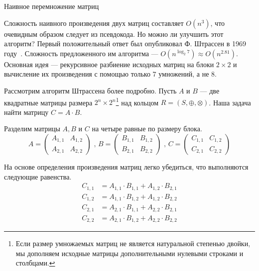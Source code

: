 \begin{algorithm}
\begin{algorithmic}[1]\label{algo:MxM}
\caption{Наивное перемножение матриц}
    \EndFor
    \EndFor
    \EndFor

\EndFunction
\end{algorithmic}
\end{algorithm}

Сложность наивного произведения двух матриц составляет $O(n^3)$, что очевидным образом следует из псевдокода. Но можно ли улучшить этот алгоритм? Первый положительный ответ был опубликовал Ф. Штрассен в 1969 году~\cite{Strassen1969}. Сложность предложенного им алгоритма --- $O(n^{\log_2 7}) \approx O(n^{2.81})$. Основная идея --- рекурсивное разбиение исходных матриц на блоки $2 \times 2$ и вычисление их произведения с помощью только 7 умножений, а не 8.

Рассмотрим алгоритм Штрассена более подробно. Пусть $A$ и $B$ --- две квадратные матрицы размера $2^n \times 2^n$\footnote{Если размер умножаемых матриц не является натуральной степенью двойки, мы дополняем исходные матрицы дополнительными нулевыми строками и столбцами.} над кольцом $R=(S,\oplus,\otimes)$. Наша задача найти матрицу $C = A \cdot B$.

Разделим матрицы $A, B$ и $C$ на четыре равные по размеру блока.
$$
A =
\begin{pmatrix}
  A_{1,1} & A_{1,2} \\
  A_{2,1} & A_{2,2}
 \end{pmatrix} \mbox{ , }
 B =
 \begin{pmatrix}
   B_{1,1} & B_{1,2} \\
   B_{2,1} & B_{2,2}
 \end{pmatrix} \mbox{ , }
 C =
 \begin{pmatrix}
   C_{1,1} & C_{1,2} \\
   C_{2,1} & C_{2,2}
 \end{pmatrix}
$$

На основе определения произведения матриц легко убедиться, что выполняются следующие равенства.
\begin {align*}
C_{1,1}&= A_{1,1} \cdot B_{1,1} + A_{1,2} \cdot B_{2,1} \\
C_{1,2}&= A_{1,1} \cdot B_{1,2} + A_{1,2} \cdot B_{2,2} \\
C_{2,1}&= A_{2,1} \cdot B_{1,1} + A_{2,2} \cdot B_{2,1} \\
C_{2,2}&= A_{2,1} \cdot B_{1,2} + A_{2,2} \cdot B_{2,2}
\end {align*}

